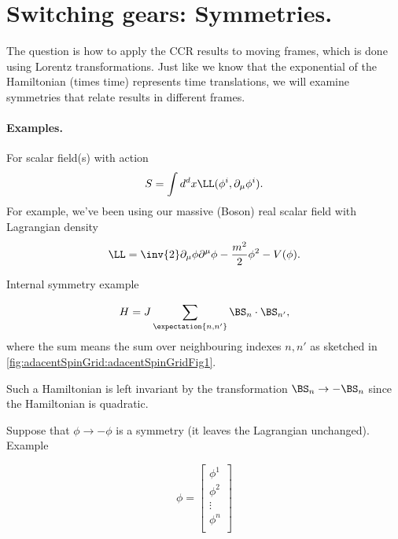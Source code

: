 %
%
\section{Switching gears: Symmetries.}

The question is how to apply the CCR results to moving frames, which is done using Lorentz transformations.  Just like we know that the exponential of the Hamiltonian (times time) represents time translations, we will examine symmetries that relate results in different frames.

\paragraph{Examples.}

For scalar field(s) with action
\begin{dmath}\label{eqn:qftLecture6:880}
S = \int d^d x \LL(\phi^i, \partial_\mu \phi^i).
\end{dmath}
For example, we've been using our massive (Boson) real scalar field with Lagrangian density
\begin{dmath}\label{eqn:qftLecture6:900}
\LL = \inv{2} \partial_\mu \phi\partial^\mu \phi - \frac{m^2}{2} \phi^2 - V(\phi).
\end{dmath}

Internal symmetry example

\begin{dmath}\label{eqn:qftLecture6:920}
H = J \sum_{\expectation{n, n'}} \BS_n \cdot \BS_{n'},
\end{dmath}
where the sum means the sum over neighbouring indexes \( n, n' \) as sketched in
\cref{fig:adacentSpinGrid:adacentSpinGridFig1}.

Such a Hamiltonian is left invariant by the transformation \( \BS_n \rightarrow -\BS_n \) since the Hamiltonian is quadratic.

Suppose that \( \phi \rightarrow -\phi\) is a symmetry (it leaves the Lagrangian unchanged).  Example

\begin{dmath}\label{eqn:qftLecture6:940}
\phi =
\begin{bmatrix}
\phi^1 \\
\phi^2 \\
\vdots \\
\phi^n \\
\end{bmatrix}
\end{dmath}

